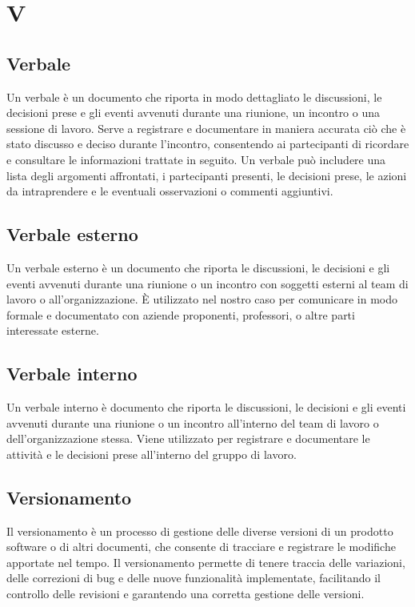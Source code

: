 \section{V} 
\subsection{Verbale} 
Un verbale è un documento che riporta in modo dettagliato le discussioni, le decisioni prese e gli eventi avvenuti durante una riunione, un incontro o una sessione di lavoro. Serve a registrare e documentare in maniera accurata ciò che è stato discusso e deciso durante l'incontro, consentendo ai partecipanti di ricordare e consultare le informazioni trattate in seguito. Un verbale può includere una lista degli argomenti affrontati, i partecipanti presenti, le decisioni prese, le azioni da intraprendere e le eventuali osservazioni o commenti aggiuntivi. 
\subsection{Verbale esterno} 
Un verbale esterno è un documento che riporta le discussioni, le decisioni e gli eventi avvenuti durante una riunione o un incontro con soggetti esterni al team di lavoro o all'organizzazione. È utilizzato nel nostro caso per comunicare in modo formale e documentato con aziende proponenti, professori, o altre parti interessate esterne.
\subsection{Verbale interno} 
Un verbale interno è documento che riporta le discussioni, le decisioni e gli eventi avvenuti durante una riunione o un incontro all'interno del team di lavoro o dell'organizzazione stessa. Viene utilizzato per registrare e documentare le attività e le decisioni prese all'interno del gruppo di lavoro.
\subsection{Versionamento} 
Il versionamento è un processo di gestione delle diverse versioni di un prodotto software o di altri documenti, che consente di tracciare e registrare le modifiche apportate nel tempo. Il versionamento permette di tenere traccia delle variazioni, delle correzioni di bug e delle nuove funzionalità implementate, facilitando il controllo delle revisioni e garantendo una corretta gestione delle versioni. 

